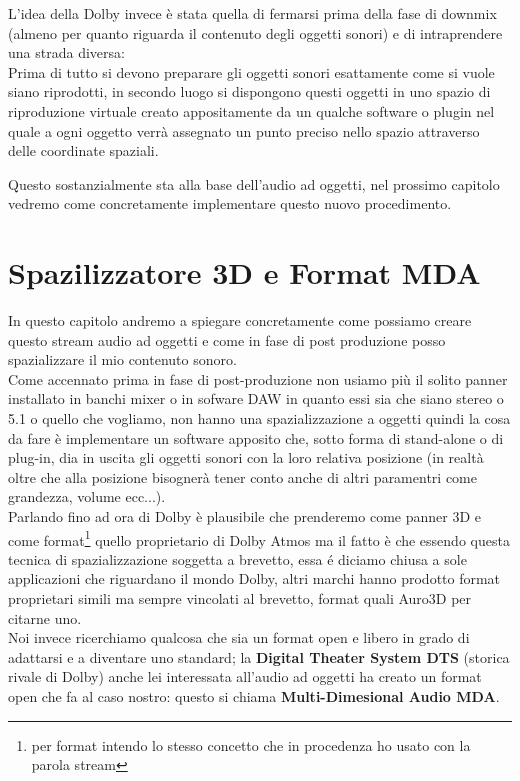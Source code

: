 \documentclass[12pt,a4paper]{report}
\begin{document}
L'idea della Dolby invece è stata quella di fermarsi prima della fase di downmix (almeno per quanto riguarda il contenuto degli oggetti sonori) e di intraprendere una strada diversa:\\

Prima di tutto si devono preparare gli oggetti sonori esattamente come si vuole siano riprodotti, in secondo luogo si dispongono questi oggetti in uno spazio di riproduzione virtuale creato appositamente da un qualche software o plugin nel quale a ogni oggetto verrà assegnato un punto preciso nello spazio attraverso delle coordinate spaziali.

Questo sostanzialmente sta alla base dell'audio ad oggetti, nel prossimo capitolo vedremo come concretamente implementare questo nuovo procedimento.



\chapter{Spazilizzatore 3D e Format MDA}\label{dolby}

In questo capitolo andremo a spiegare concretamente come possiamo creare questo stream audio ad oggetti e come in fase di post produzione posso spazializzare il mio contenuto sonoro.\\

Come accennato prima in fase di post-produzione non usiamo più il solito panner installato in banchi mixer o in sofware DAW in quanto essi sia che siano stereo o 5.1 o quello che vogliamo, non hanno una spazializzazione a oggetti quindi la cosa da fare è implementare un software apposito che, sotto forma di stand-alone o di plug-in, dia in uscita gli oggetti sonori con la loro relativa posizione (in realtà oltre che alla posizione bisognerà tener conto anche di altri paramentri come grandezza, volume ecc...).\\

Parlando fino ad ora di Dolby è plausibile che prenderemo come panner 3D e come format\footnote{per format intendo lo stesso concetto che in procedenza ho usato con la parola stream} quello proprietario di Dolby Atmos ma il fatto è che essendo questa tecnica di spazializzazione soggetta a brevetto, essa é diciamo chiusa a sole applicazioni che riguardano il mondo Dolby, altri marchi hanno prodotto format proprietari simili ma sempre vincolati al brevetto, format quali Auro3D per citarne uno.\\

Noi invece ricerchiamo qualcosa che sia un format open e libero in grado di adattarsi e a diventare uno standard; la \textbf{Digital Theater System DTS} (storica rivale di Dolby) anche lei interessata all'audio ad oggetti ha creato un format open che fa al caso nostro: questo si chiama \textbf{Multi-Dimesional Audio MDA}.\\
\end{document}

